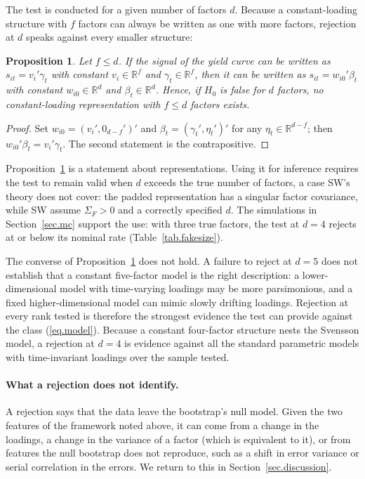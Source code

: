 \documentclass[11pt]{article}
\newtheorem{proposition}{Proposition}
\begin{document}
The test is conducted for a given number of factors $d$. Because a constant-loading structure with $f$ factors can always be written as one with more factors, rejection at $d$ speaks against every smaller structure:

\begin{proposition}\label{prop.rank}
Let $f\le d$. If the signal of the yield curve can be written as $s_{it}=v_i'\gamma_t$ with constant $v_i\in\mathbb R^f$ and $\gamma_t\in\mathbb R^f$, then it can be written as $s_{it}=w_{i0}'\beta_t$ with constant $w_{i0}\in\mathbb R^d$ and $\beta_t\in\mathbb R^d$. Hence, if $H_0$ is false for $d$ factors, no constant-loading representation with $f\le d$ factors exists.
\end{proposition}

\begin{proof}
Set $w_{i0}=(v_i',0_{d-f}')'$ and $\beta_t=(\gamma_t',\eta_t')'$ for any $\eta_t\in\mathbb R^{d-f}$; then $w_{i0}'\beta_t=v_i'\gamma_t$. The second statement is the contrapositive.
\end{proof}

Proposition~\ref{prop.rank} is a statement about representations. Using it for inference requires the test to remain valid when $d$ exceeds the true number of factors, a case SW's theory does not cover: the padded representation has a singular factor covariance, while SW assume $\Sigma_F>0$ and a correctly specified $d$. The simulations in Section~\ref{sec.mc} support the use: with three true factors, the test at $d=4$ rejects at or below its nominal rate (Table~\ref{tab.fakesize}).

The converse of Proposition~\ref{prop.rank} does not hold. A failure to reject at $d=5$ does not establish that a constant five-factor model is the right description: a lower-dimensional model with time-varying loadings may be more parsimonious, and a fixed higher-dimensional model can mimic slowly drifting loadings. Rejection at every rank tested is therefore the strongest evidence the test can provide against the class (\ref{eq.model}). Because a constant four-factor structure nests the Svensson model, a rejection at $d=4$ is evidence against all the standard parametric models with time-invariant loadings over the sample tested.

\paragraph{What a rejection does not identify.} A rejection says that the data leave the bootstrap's null model. Given the two features of the framework noted above, it can come from a change in the loadings, a change in the variance of a factor (which is equivalent to it), or from features the null bootstrap does not reproduce, such as a shift in error variance or serial correlation in the errors. We return to this in Section~\ref{sec.discussion}.
\end{document}
